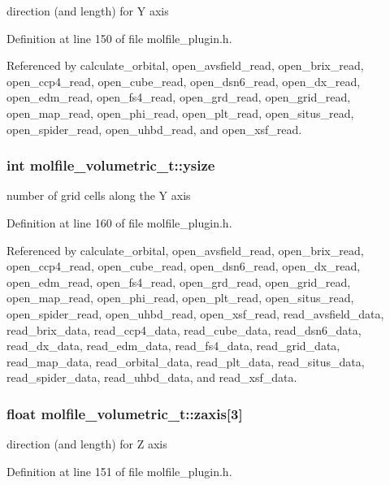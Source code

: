 direction (and length) for Y axis 

Definition at line 150 of file molfile\_\-plugin.h.

Referenced by calculate\_\-orbital, open\_\-avsfield\_\-read, open\_\-brix\_\-read, open\_\-ccp4\_\-read, open\_\-cube\_\-read, open\_\-dsn6\_\-read, open\_\-dx\_\-read, open\_\-edm\_\-read, open\_\-fs4\_\-read, open\_\-grd\_\-read, open\_\-grid\_\-read, open\_\-map\_\-read, open\_\-phi\_\-read, open\_\-plt\_\-read, open\_\-situs\_\-read, open\_\-spider\_\-read, open\_\-uhbd\_\-read, and open\_\-xsf\_\-read.
\subsubsection{\setlength{\rightskip}{0pt plus 5cm}int molfile\_\-volumetric\_\-t::ysize}\label{structmolfile__volumetric__t_m6}


number of grid cells along the Y axis 

Definition at line 160 of file molfile\_\-plugin.h.

Referenced by calculate\_\-orbital, open\_\-avsfield\_\-read, open\_\-brix\_\-read, open\_\-ccp4\_\-read, open\_\-cube\_\-read, open\_\-dsn6\_\-read, open\_\-dx\_\-read, open\_\-edm\_\-read, open\_\-fs4\_\-read, open\_\-grd\_\-read, open\_\-grid\_\-read, open\_\-map\_\-read, open\_\-phi\_\-read, open\_\-plt\_\-read, open\_\-situs\_\-read, open\_\-spider\_\-read, open\_\-uhbd\_\-read, open\_\-xsf\_\-read, read\_\-avsfield\_\-data, read\_\-brix\_\-data, read\_\-ccp4\_\-data, read\_\-cube\_\-data, read\_\-dsn6\_\-data, read\_\-dx\_\-data, read\_\-edm\_\-data, read\_\-fs4\_\-data, read\_\-grid\_\-data, read\_\-map\_\-data, read\_\-orbital\_\-data, read\_\-plt\_\-data, read\_\-situs\_\-data, read\_\-spider\_\-data, read\_\-uhbd\_\-data, and read\_\-xsf\_\-data.
\subsubsection{\setlength{\rightskip}{0pt plus 5cm}float molfile\_\-volumetric\_\-t::zaxis[3]}\label{structmolfile__volumetric__t_m4}


direction (and length) for Z axis 

Definition at line 151 of file molfile\_\-plugin.h.

